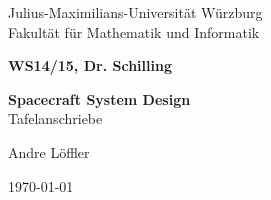 \begin{titlepage}
  Julius-Maximilians-Universität Würzburg\\
  Fakultät für Mathematik und Informatik
  
  \vspace{3cm}
  
  \begin{center}
   \LARGE\textbf{WS14/15, Dr. Schilling}
  \end{center}
  
  \vspace{0cm}
  
  \begin{center}
   \huge\textbf{Spacecraft System Design}
   \\Tafelanschriebe
  \end{center}
  
  \vspace{1cm}
  
  \begin{center}
   \Large Andre Löffler
  \end{center}
  
  \vspace{0cm}
  
  \begin{center}
   \Large \today
  \end{center}
  
  
\end{titlepage}
